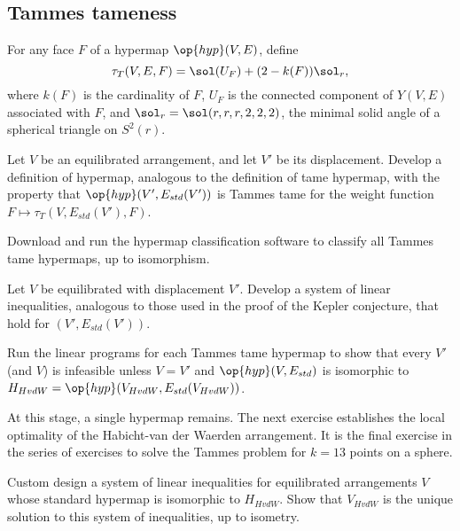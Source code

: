 \subsection{Tammes tameness}

For any face $F$ of a hypermap $\op{hyp}(V,E)$, define
\[
\tau_T(V,E,F) = \sol(U_F) + (2- k(F)) \sol_r,
\]
where $k(F)$ is the cardinality of $F$, $U_F$ is the connected
component of $Y(V,E)$ associated with $F$, and $\sol_r =
\sol(r,r,r,2,2,2)$, the minimal solid angle of a spherical triangle on
$S^2(r)$.

\begin{exer}  
  Let $V$ be an equilibrated arrangement, and let $V'$ be its
  displacement.  Develop a definition of 
  hypermap, analogous to the definition of tame hypermap, with the
  property that $\op{hyp}(V',E_{std}(V'))$ is Tammes tame for the
  weight function $F\mapsto \tau_T(V,E_{std}(V'),F)$.
\end{exer}

\begin{exer}  
  Download and run the hypermap classification software to classify all Tammes tame
  hypermaps, up to isomorphism.
\end{exer}

\begin{exer} Let $V$ be equilibrated with displacement $V'$.  Develop
  a system of linear inequalities, analogous to those used in the
  proof of the Kepler conjecture, that hold for $(V',E_{std}(V'))$.  
\end{exer}

\begin{exer}
  Run the linear programs for each Tammes tame hypermap to show that
  every $V'$ (and $V$) is infeasible unless $V=V'$ and
  $\op{hyp}(V,E_{std})$ is isomorphic to
  $H_{HvdW}=\op{hyp}(V_{HvdW},E_{std}(V_{HvdW}))$.
\end{exer}

At this stage, a single hypermap remains.  The next exercise
establishes the local optimality of the Habicht-van der Waerden
arrangement.  It is the final exercise in the series of exercises to
solve the Tammes problem for $k=13$ points on a sphere.

\begin{exer} 
  Custom design a system of linear inequalities for equilibrated
  arrangements $V$ whose standard hypermap is isomorphic to
  $H_{HvdW}$.  Show that $V_{HvdW}$ is the unique solution to this
  system of inequalities, up to isometry.
\end{exer}





